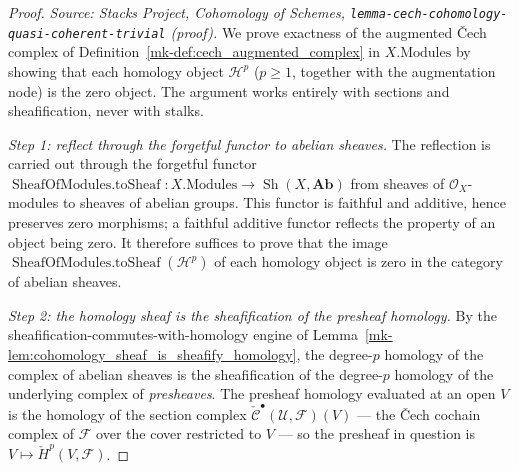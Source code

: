 \begin{proof}
  \leanok
    \textit{Source: Stacks Project, Cohomology of Schemes,
  \texttt{lemma-cech-cohomology-quasi-coherent-trivial} (proof).}
  We prove exactness of the augmented {\v C}ech complex of
  Definition~\ref{mk-def:cech_augmented_complex} in \(X.\mathrm{Modules}\) by showing that each homology
  object \(\mathcal{H}^p\) (\(p \geq 1\), together with the augmentation node) is the zero object. The
  argument works entirely with sections and sheafification, never with stalks.

  \emph{Step 1: reflect through the forgetful functor to abelian sheaves.} The reflection is carried
  out through the forgetful functor \(\operatorname{SheafOfModules.toSheaf} : X.\mathrm{Modules} \to
  \operatorname{Sh}(X, \mathbf{Ab})\) from sheaves of \(\mathcal{O}_X\)-modules to sheaves of abelian
  groups. This functor is faithful and additive, hence preserves zero morphisms; a faithful additive
  functor reflects the property of an object being zero. It therefore suffices to prove that the image
  \(\operatorname{SheafOfModules.toSheaf}(\mathcal{H}^p)\) of each homology object is zero in the
  category of abelian sheaves.

  \emph{Step 2: the homology sheaf is the sheafification of the presheaf homology.} By the
  sheafification-commutes-with-homology engine of
  Lemma~\ref{mk-lem:cohomology_sheaf_is_sheafify_homology}, the degree-\(p\) homology of the complex of
  abelian sheaves is the sheafification of the degree-\(p\) homology of the underlying complex of
  \emph{presheaves}. The presheaf homology evaluated at an open \(V\) is the homology of the section
  complex \(\check{\mathcal{C}}^\bullet(\mathcal{U}, \mathcal{F})(V)\) --- the {\v C}ech cochain complex
  of \(\mathcal{F}\) over the cover restricted to \(V\) --- so the presheaf in question is
  \(V \mapsto \check{H}^p(V, \mathcal{F})\).


\end{proof}
